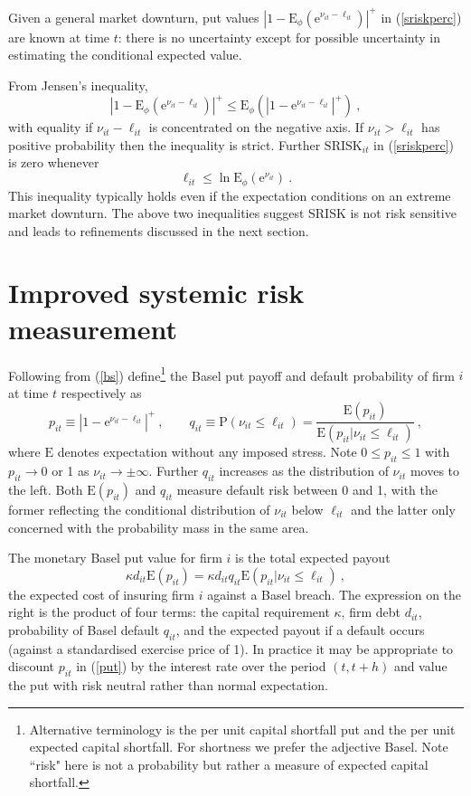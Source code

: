 \documentclass[12pt]{article}
\newcommand{\E}{\mathrm{E}}
\newcommand{\p}{\mathrm{P}}
\newcommand{\e}{\mathrm{e}}
\newcommand{\Es}{\E_\phi}
\newcommand{\eref}[1]{(\ref{#1})}
\newcommand{\cq}{\ , \qquad}
\newcommand{\be}[1]{\begin{equation}\label{#1}}
\newcommand{\ee}{\end{equation}}
\begin{document}
Given a general market downturn, put values $|1-\Es(\e^{\nu_{it}-\ell_{it}})|^+$  in \eref{sriskperc} are known at time $t$:  there is no uncertainty except for possible  uncertainty in estimating the conditional  expected value.

From Jensen's inequality,
$$
\left|1-\Es(\e^{\nu_{it}-\ell_{it}})\right|^+ \le\Es\left(\left|1-\e^{\nu_{it}-\ell_{it}}\right|^+\right)\ ,
$$
with equality  if  $\nu_{it}-\ell_{it}$ is concentrated on the negative axis.  If  $\nu_{it}>\ell_{it}$  has positive probability then the  inequality is strict.   Further $\mathrm{SRISK}_{it}$ in \eref{sriskperc}   is zero whenever
$$
\ell_{it}\le \ln\Es(\e^{\nu_{it}})\ .
$$
This inequality typically holds even if the expectation conditions on an extreme market downturn. The above two inequalities suggest SRISK is not risk sensitive and leads to refinements discussed in the next section.

\section{Improved systemic risk measurement}\label{improve}

Following from \eref{bs}   define\footnote{Alternative terminology is the per unit capital shortfall put and the per unit expected capital shortfall.  For shortness we prefer the adjective Basel.  Note ``risk" here is not a probability but rather a measure of expected capital shortfall.} the  Basel put payoff and default probability of firm $i$ at time $t$ respectively as
\be{put}
p_{it}\equiv \left|1-\e^{\nu_{it}-\ell_{it}}\right|^+\cq q_{it}\equiv \p(\nu_{it}\le \ell_{it})=\frac{\E(p_{it})}{\E(p_{it}|\nu_{it}\le \ell_{it})}\ ,
\ee
where $\E$ denotes expectation without any imposed stress.  Note $0\le p_{it}\le 1$ with $p_{it}\rightarrow 0$ or 1 as $\nu_{it}\rightarrow\pm\infty$.
Further $q_{it}$ increases as the distribution of $\nu_{it}$ moves to the left.  Both $\E(p_{it})$ and $q_{it}$ measure default risk between 0 and 1, with the former reflecting the conditional distribution of $\nu_{it}$ below $\ell_{it}$ and the latter only concerned with the probability mass in the same area.


The monetary Basel put value  for firm  $i$ is the total expected payout
$$
\kappa d_{it}\E(p_{it}) = \kappa d_{it}q_{it}\E(p_{it}|\nu_{it}\le \ell_{it})\ ,
$$
the expected cost of insuring firm $i$ against a Basel breach.  The expression on the right is the product of four terms: the capital requirement $\kappa$, firm debt $d_{it}$, probability of Basel default $q_{it}$, and the expected payout if a default occurs (against a standardised exercise price of 1). In practice it may be appropriate to discount $p_{it}$ in \eref{put} by the interest rate over the period $(t,t+h)$ and value the put with risk neutral rather than normal expectation.
\end{document}
